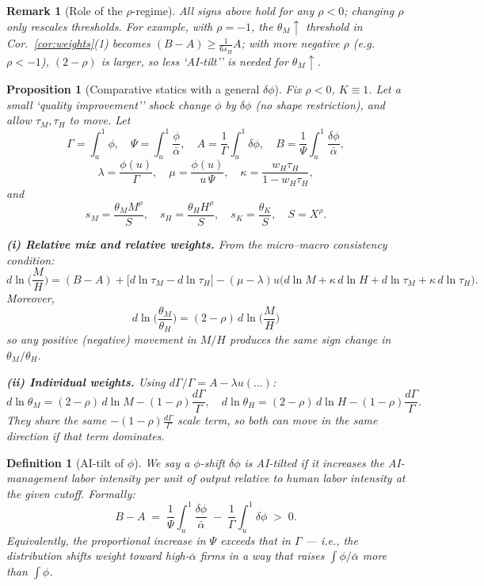 \documentclass[english]{article}
\newtheorem{proposition}{Proposition}
\newtheorem{remark}{Remark}
\newtheorem{definition}{Definition}
\begin{document}
\begin{remark}[Role of the $\rho$-regime]
All signs above hold for any $\rho<0$; changing $\rho$ only rescales thresholds. 
For example, with $\rho=-1$, the $\theta_M\uparrow$ threshold in Cor.~\ref{cor:weights}(1) becomes $(B-A)\ge \frac{1}{6s_H}A$; with more negative $\rho$ (e.g.\ $\rho<-1$), $(2-\rho)$ is larger, so less `AI-tilt'' is needed for $\theta_M\uparrow$.
\end{remark}




\newpage



\begin{proposition}[Comparative statics with a general $\delta\phi$]\label{prop:signs}
Fix $\rho<0$, $K\equiv 1$. Let a small `quality improvement'' shock change $\phi$ by $\delta\phi$ (no shape restriction), and allow $\tau_M,\tau_H$ to move.  
Let 
\[
\Gamma=\int_u^1\phi,\quad \Psi=\int_u^1\frac{\phi}{\bar\alpha},\quad
A=\frac{1}{\Gamma}\int_u^1\delta\phi,\quad B=\frac{1}{\Psi}\int_u^1\frac{\delta\phi}{\bar\alpha},
\]
\[
\lambda=\frac{\phi(u)}{\Gamma},\quad \mu=\frac{\phi(u)}{u\,\Psi},\quad
\kappa=\frac{w_H\tau_H}{1-w_H\tau_H},
\]
and 
\[
s_M=\frac{\theta_M M^\rho}{S},\quad s_H=\frac{\theta_H H^\rho}{S},\quad s_K=\frac{\theta_K}{S},\quad S=X^\rho.
\]

\smallskip
\noindent\textbf{(i) Relative mix and relative weights.}  
From the micro–macro consistency condition:
\[
d\ln\!\Big(\frac{M}{H}\Big)
= (B-A) + \big[d\ln\tau_M - d\ln\tau_H\big]
- (\mu-\lambda)u\Big( d\ln M + \kappa\,d\ln H + d\ln\tau_M + \kappa\,d\ln\tau_H\Big).
\]
Moreover,
\[
\boxed{\ d\ln\!\Big(\frac{\theta_M}{\theta_H}\Big)=(2-\rho)\,d\ln\!\Big(\frac{M}{H}\Big)\ }
\]
so any positive (negative) movement in $M/H$ produces the same sign change in $\theta_M/\theta_H$.

\smallskip
\noindent\textbf{(ii) Individual weights.}  
Using $d\Gamma/\Gamma=A-\lambda u(\dots)$:
\[
d\ln\theta_M=(2-\rho)\,d\ln M-(1-\rho)\frac{d\Gamma}{\Gamma},\quad
d\ln\theta_H=(2-\rho)\,d\ln H-(1-\rho)\frac{d\Gamma}{\Gamma}.
\]
They share the same $-(1-\rho)\frac{d\Gamma}{\Gamma}$ scale term, so both can move in the same direction if that term dominates.

\end{proposition}

\begin{definition}[AI-tilt of $\phi$]
We say a $\phi$-shift $\delta\phi$ is \emph{AI-tilted} if it increases the \emph{AI-management labor intensity per unit of output} relative to human labor intensity at the given cutoff. Formally:
\[
B-A \;=\; \frac{1}{\Psi}\int_u^1\frac{\delta\phi}{\bar\alpha} \;-\; \frac{1}{\Gamma}\int_u^1\delta\phi \;>\; 0.
\]
Equivalently, the proportional increase in $\Psi$ exceeds that in $\Gamma$ — i.e., the distribution shifts weight toward high-$\bar\alpha$ firms in a way that raises $\int\phi/\bar\alpha$ more than $\int\phi$.
\end{definition}
\end{document}
